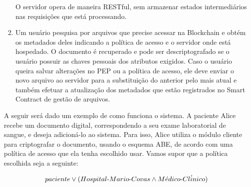 \documentclass[a4paper,11pt]{article}
\begin{document}
\begin{enumerate}[label=(\arabic*)]
  O servidor opera de maneira RESTful, sem armazenar estados intermediários nas requisições que está processando.
  \item Um usuário pesquisa por arquivos que precise acessar na Blockchain e obtém os metadados deles indicando a política de acesso e o servidor onde está hospedado.
  O documento é recuperado e pode ser descriptografado se o usuário possuir as chaves pessoais dos atributos exigidos.
  Caso o usuário queira salvar alterações no PEP ou a política de acesso, ele deve enviar o novo arquivo ao servidor para a substituição do anterior pelo mais atual e também efetuar a atualização dos metadados que estão registrados no Smart Contract de gestão de arquivos.
\end{enumerate}

A seguir será dado um exemplo de como funciona o sistema.
A paciente Alice recebe um documento digital, correspondendo a seu exame laboratorial de sangue, e deseja adicioná-lo ao sistema.
Para isso, Alice utiliza o módulo cliente para criptografar o documento, usando o esquema ABE, de acordo com uma política de acesso que ela tenha escolhido usar.
Vamos supor que a política escolhida seja a seguinte:

\[paciente \vee (Hospital\textnormal{-}Mario\textnormal{-}Covas \wedge M\acute{e}dico\textnormal{-}Cl\acute{i}nico)\] %
\end{document}
